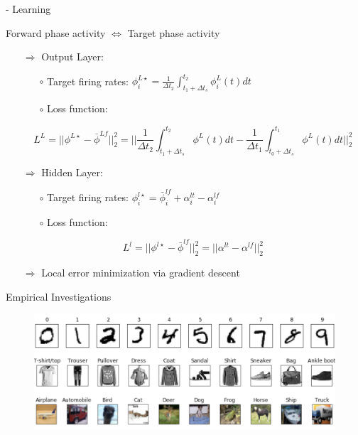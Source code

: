 \documentclass[dvipsnames, usenames]{beamer}
\begin{document}
\begin{frame}{\citet{guerguiev2017} - Learning}
	\vspace{0.5cm}
	\begin{tcolorbox}
	Forward phase activity $\Leftrightarrow$ Target phase activity  
	\end{tcolorbox}
	\pause

\begin{itemize}
	\item[$\Rightarrow$] Output Layer:
	\begin{itemize}
		\item[$\circ$] Target firing rates: $\phi_i^{L\star} = \frac{1}{\Delta t_2} \int_{t_1 + \Delta t_s}^{t_2} \phi_i^L(t)dt$
		\item[$\circ$] Loss function: 
	\end{itemize}
	\vspace{0.5cm}
	$$L^L = ||\phi^{L\star} - \bar{\phi}^{Lf}||_2^2 = ||\frac{1}{\Delta t_2} \int_{t_1 + \Delta t_s}^{t_2} \phi^L(t)dt - \frac{1}{\Delta t_1} \int_{t_0 + \Delta t_s}^{t_1} \phi^L(t)dt||_2^2$$
	\pause
	\item[$\Rightarrow$] Hidden Layer:
	\begin{itemize}
		\item[$\circ$] Target firing rates: $\phi_i^{l\star} = \bar{\phi}_i^{lf} + \alpha_i^{lt} - \alpha_i^{lf}$
		\item[$\circ$] Loss function:
	\end{itemize}
	\vspace{0.5cm}
	$$L^l = ||\phi^{l\star} - \bar{\phi}^{lf}||_2^2 = ||\alpha^{lt} - \alpha^{lf}||_2^2$$
	\pause
	\item[$\Rightarrow$] Local error minimization via gradient descent
\end{itemize}
\end{frame}


\begin{frame}[noframenumbering]{Empirical Investigations}
	\begin{figure}
		\centering
		\includegraphics[width=\textwidth]{../figures/report/datasets}
	\end{figure}
\end{frame}
\end{document}
